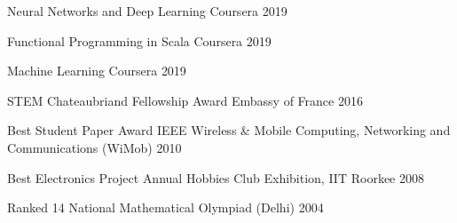 


\begin{cvhonors}

  \cvhonor
    {Neural Networks and Deep Learning} %
    {Coursera} %
    {} %
    {2019} %
    
  \cvhonor
    {Functional Programming in Scala} %
    {Coursera} %
    {} %
    {2019} %
    
  \cvhonor
    {Machine Learning} %
    {Coursera} %
    {} %
    {2019} %


  \cvhonor
    {STEM Chateaubriand Fellowship Award} %
    {Embassy of France} %
    {} %
    {2016} %

%
  \cvhonor
    {Best Student Paper Award} %
    {IEEE Wireless \& Mobile Computing, Networking and Communications (WiMob)} %
    {} %
    {2010} %

  \cvhonor
    {Best Electronics Project} %
    {Annual Hobbies Club Exhibition, IIT Roorkee} %
    {} %
    {2008} %
    
  \cvhonor
    {Ranked 14} %
    {National Mathematical Olympiad (Delhi)} %
    {} %
    {2004} %

\end{cvhonors}


